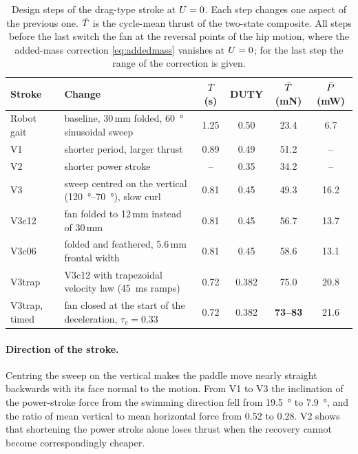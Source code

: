 \begin{table}[t]
  \centering
  \caption[Design steps of the drag-type stroke]{Design steps of the drag-type stroke at $U=0$. Each step changes
    one aspect of the previous one. $\bar{T}$ is the cycle-mean thrust of the two-state composite. All steps before the last
    switch the fan at the reversal points of the hip motion, where the added-mass correction \eqref{eq:addedmass} vanishes
    at $U=0$; for the last step the range of the correction is given.}
  \label{tab:drag-design}
  \small
  \begin{tabularx}{\textwidth}{@{}l>{\raggedright\arraybackslash}Xcccc@{}}
    \toprule
    Stroke & Change & $T$ (s) & DUTY & $\bar{T}$ (mN) & $\bar{P}$ (mW) \\
    \midrule
    Robot gait & baseline, 30\,mm folded, \SI{60}{\degree} sinusoidal sweep & 1.25 & 0.50 & 23.4 & 6.7 \\
    V1 & shorter period, larger thrust & 0.89 & 0.49 & 51.2 & -- \\
    V2 & shorter power stroke & -- & 0.35 & 34.2 & -- \\
    V3 & sweep centred on the vertical (\SIrange{120}{70}{\degree}), slow curl & 0.81 & 0.45 & 49.3 & 16.2 \\
    V3c12 & fan folded to 12\,mm instead of 30\,mm & 0.81 & 0.45 & 56.7 & 13.7 \\
    V3c06 & folded and feathered, 5.6\,mm frontal width & 0.81 & 0.45 & 58.6 & 13.1 \\
    V3trap & V3c12 with trapezoidal velocity law (\SI{45}{\milli\second} ramps) & 0.72 & 0.382 & 75.0 & 20.8 \\
    V3trap, timed & fan closed at the start of the deceleration, $\tau_c=0.33$ & 0.72 & 0.382 & \textbf{73--83} & 21.6 \\
    \bottomrule
  \end{tabularx}
\end{table}

\paragraph{Direction of the stroke.} Centring the sweep on the vertical makes the paddle move nearly straight
backwards with its face normal to the motion. From V1 to V3 the inclination of the power-stroke force from the
swimming direction fell from \SI{19.5}{\degree} to \SI{7.9}{\degree}, and the ratio of mean vertical to mean
horizontal force from 0.52 to 0.28. V2 shows that shortening the power stroke alone loses thrust when the
recovery cannot become correspondingly cheaper.

